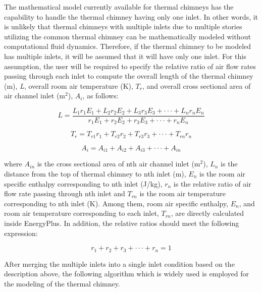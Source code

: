 The mathematical model currently available for thermal chimneys has the capability to handle the thermal chimney having only one inlet. In other words, it is unlikely that thermal chimneys with multiple inlets due to multiple stories utilizing the common thermal chimney can be mathematically modeled without computational fluid dynamics. Therefore, if the thermal chimney to be modeled has multiple inlets, it will be assumed that it will have only one inlet. For this assumption, the user will be required to specify the relative ratio of air flow rates passing through each inlet to compute the overall length of the thermal chimney (m), \emph{L}, overall room air temperature (K), \(T_{r}\), and overall cross sectional area of air channel inlet (m\(^{2}\)), \(A_{i}\), as follows:

\begin{equation}
L = \frac{{{L_1}{r_1}{E_1} + {L_2}{r_2}{E_2} + {L_3}{r_3}{E_3} +  \cdot  \cdot  \cdot  + {L_n}{r_n}{E_n}}}{{{r_1}{E_1} + {r_2}{E_2} + {r_3}{E_3} +  \cdot  \cdot  \cdot  + {r_n}{E_n}}}
\end{equation}

\begin{equation}
{T_r} = {T_{r1}}{r_1} + {T_{r2}}{r_2} + {T_{r3}}{r_3} +  \cdot  \cdot  \cdot  + {T_{rn}}{r_n}
\end{equation}

\begin{equation}
{A_i} = {A_{i1}} + {A_{i2}} + {A_{i3}} +  \cdot  \cdot  \cdot  + {A_{in}}
\end{equation}

where \(A_{in}\) is the cross sectional area of nth air channel inlet (m\(^{2}\)), \(L_{n}\) is the distance from the top of thermal chimney to nth inlet (m), \(E_{n}\) is the room air specific enthalpy corresponding to nth inlet (J/kg), \(r_{n}\) is the relative ratio of air flow rate passing through nth inlet and \(T_{rn}\) is the room air temperature corresponding to nth inlet (K). Among them, room air specific enthalpy, \(E_{n}\), and room air temperature corresponding to each inlet, \(T_{rn}\), are directly calculated inside EnergyPlus. In addition, the relative ratios should meet the following expression:

\begin{equation}
{r_1} + {r_2} + {r_3} +  \cdot  \cdot  \cdot  + {r_n} = 1
\end{equation}

After merging the multiple inlets into a single inlet condition based on the description above, the following algorithm which is widely used is employed for the modeling of the thermal chimney.

